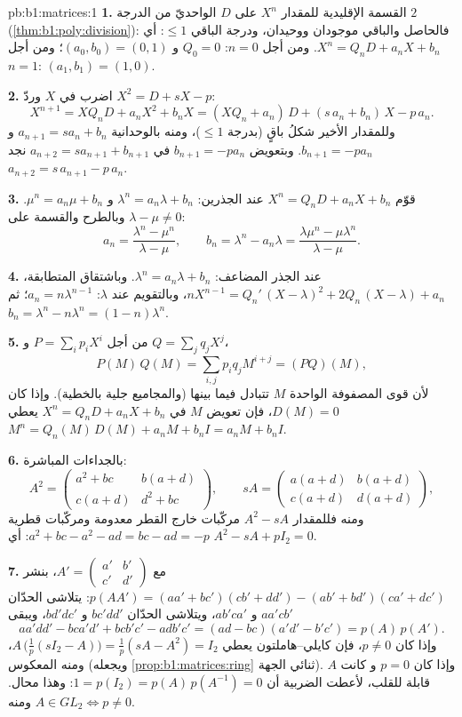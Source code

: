 \begin{solution}{pb:b1:matrices:1}
\textbf{1.} القسمة الإقليدية للمقدار $X^n$ على $D$ الواحديّ من الدرجة
$2$ (\cref{thm:b1:poly:division}): فالحاصل والباقي موجودان
ووحيدان، ودرجة الباقي $\leq 1$: أي $X^n =
Q_n D + a_n X + b_n$. ومن أجل $n = 0$: $Q_0 = 0$ و $(a_0, b_0) = (0,
1)$؛ ومن أجل $n = 1$: $(a_1, b_1) = (1, 0)$.

\textbf{2.} اضرب في $X$ وردّ $X^2 = D + sX - p$:
\[
X^{n+1} = X Q_n D + a_n X^2 + b_n X
= (X Q_n + a_n)\,D + (s\,a_n + b_n)\,X - p\,a_n .
\]
وللمقدار الأخير شكلُ باقٍ (بدرجة $\leq 1$)، ومنه بالوحدانية
$a_{n+1} = s a_n + b_n$ و $b_{n+1} = -p a_n$.
وبتعويض $b_{n+1} = -pa_n$ في $a_{n+2} = s a_{n+1} +
b_{n+1}$ نجد $a_{n+2} = s\,a_{n+1} - p\,a_n$.

\textbf{3.} قوّم $X^n = Q_n D + a_n X + b_n$ عند الجذرين:
$\lambda^n = a_n\lambda + b_n$ و $\mu^n = a_n\mu + b_n$.
وبالطرح والقسمة على $\lambda - \mu \neq 0$:
\[
a_n = \frac{\lambda^n - \mu^n}{\lambda - \mu},
\qquad
b_n = \lambda^n - a_n\lambda
= \frac{\lambda\mu^n - \mu\lambda^n}{\lambda - \mu} .
\]

\textbf{4.} عند الجذر المضاعف: $\lambda^n = a_n\lambda + b_n$.
وباشتقاق المتطابقة، $nX^{n-1} = Q_n'\,(X - \lambda)^2
+ 2Q_n\,(X - \lambda) + a_n$، وبالتقويم عند $\lambda$: $a_n
= n\lambda^{n-1}$؛ ثم $b_n = \lambda^n - n\lambda^{n} = (1 -
n)\lambda^{n}$.

\textbf{5.} من أجل $P = \sum_i p_i X^i$ و $Q = \sum_j q_j X^j$،
\[
P(M)\,Q(M) = \sum_{i,j} p_i q_j M^{i+j} = (PQ)(M),
\]
لأن قوى المصفوفة الواحدة $M$ تتبادل فيما بينها
(والمجاميع جلية بالخطية). وإذا كان $D(M) = 0$، فإن تعويض $M$
في $X^n = Q_n D + a_n X + b_n$ يعطي $M^n = Q_n(M)\,D(M) + a_n
M + b_n I = a_n M + b_n I$.

\textbf{6.} بالجداءات المباشرة:
\[
A^2 = \begin{pmatrix}
a^2 + bc & b(a + d)\\
c(a + d) & d^2 + bc
\end{pmatrix},
\qquad
s A = \begin{pmatrix}
a(a+d) & b(a+d)\\
c(a+d) & d(a+d)
\end{pmatrix},
\]
ومنه فللمقدار $A^2 - sA$ مركّبات خارج القطر معدومة ومركّبات قطرية
$a^2 + bc - a^2 - ad = bc - ad = -p$: أي $A^2 - sA + pI_2 = 0$.

\textbf{7.} مع $A' = \begin{pmatrix} a' & b'\\ c' &
d'\end{pmatrix}$، بنشر $p(AA') = (aa' + bc')(cb' + dd') -
(ab' + bd')(ca' + dc')$: يتلاشى الحدّان $aa'cb'$ و $ab'ca'$،
ويتلاشى الحدّان $bc'dd'$ و $bd'dc'$، ويبقى
\[
aa'dd' - bca'd' + bcb'c' - adb'c'
= (ad - bc)(a'd' - b'c') = p(A)\,p(A').
\]
وإذا كان $p \neq 0$، فإن كايلي--هاملتون يعطي $A\,\bigl(\tfrac1p(sI_2 -
A)\bigr) = \tfrac1p(sA - A^2) = I_2$، ومنه المعكوس (ويجعله
\cref{prop:b1:matrices:ring} ثنائي الجهة). وإذا كان $p = 0$ و
كانت $A$ قابلة للقلب، لأعطت الضربية أن $1 = p(I_2) =
p(A)\,p(A^{-1}) = 0$: وهذا محال. ومنه $A \in GL_2 \iff p \neq 0$.


\end{solution}
